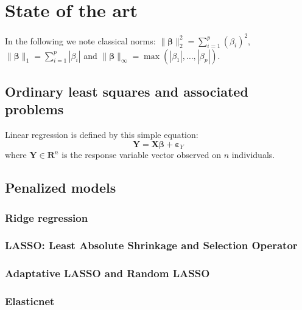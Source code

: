 \documentclass[11pt,a4paper]{report}
\begin{document}
	
\chapter{State of the art}
In the following we note classical norms: $\parallel\boldsymbol{\beta}\parallel_2^2=\sum_{i=1}^p(\beta_i)^2$, $\parallel\boldsymbol{\beta} \parallel_1=\sum_{i=1}^p|\beta_i| $ and $\parallel\boldsymbol{\beta} \parallel_{\infty}=\operatorname{max}(|\beta_1|,\dots,|\beta_p|)$.
	\section{Ordinary least squares and associated problems}
	Linear regression is defined by this simple equation:
	\begin{equation}
		\boldsymbol{Y}=\boldsymbol{X}\boldsymbol{\beta}+\boldsymbol{\varepsilon}_Y
	\end{equation}
	where $\boldsymbol{Y}\in \mathbf{R}^n$ is the response variable vector observed on $n$ individuals. 
	\section{Penalized models}
		\subsection{Ridge regression}
			\cite{hoerl1970ridge}
			\cite{marquardt1975ridge}
		\subsection{LASSO: Least Absolute Shrinkage and Selection Operator }
			\cite{tibshiranilasso}  
			\cite{tibshirani1996regression} 
			\cite{efron2004least} %
			\cite{Zhao2006MSC}%
			\cite{SAM10088}%

		\subsection{Adaptative LASSO and Random LASSO}
			\cite{zou2006adaptive}%
			\cite{wang2011random}%
		\subsection{Elasticnet}
			\cite{zou2005regularization}
\end{document}
